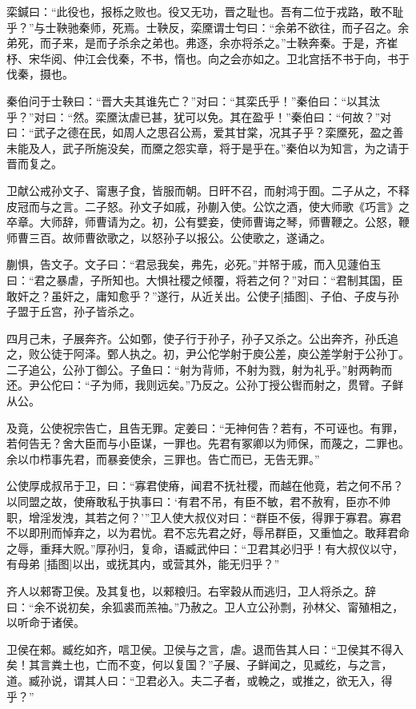\documentclass[a4paper,12pt,UTF8,twoside]{ctexbook}
\begin{document}
栾鍼曰：“此役也，报栎之败也。役又无功，晋之耻也。吾有二位于戎路，敢不耻乎？”与士鞅驰秦师，死焉。士鞅反，栾黡谓士匄曰：“余弟不欲往，而子召之。余弟死，而子来，是而子杀余之弟也。弗逐，余亦将杀之。”士鞅奔秦。于是，齐崔杼、宋华阅、仲江会伐秦，不书，惰也。向之会亦如之。卫北宫括不书于向，书于伐秦，摄也。

秦伯问于士鞅曰：“晋大夫其谁先亡？”对曰：“其栾氏乎！”秦伯曰：“以其汰乎？”对曰：“然。栾黡汰虐已甚，犹可以免。其在盈乎！”秦伯曰：“何故？”对曰：“武子之德在民，如周人之思召公焉，爱其甘棠，况其子乎？栾黡死，盈之善未能及人，武子所施没矣，而黡之怨实章，将于是乎在。”秦伯以为知言，为之请于晋而复之。

卫献公戒孙文子、甯惠子食，皆服而朝。日旰不召，而射鸿于囿。二子从之，不释皮冠而与之言。二子怒。孙文子如戚，孙蒯入使。公饮之酒，使大师歌《巧言》之卒章。大师辞，师曹请为之。初，公有嬖妾，使师曹诲之琴，师曹鞭之。公怒，鞭师曹三百。故师曹欲歌之，以怒孙子以报公。公使歌之，遂诵之。

蒯惧，告文子。文子曰：“君忌我矣，弗先，必死。”并帑于戚，而入见蘧伯玉曰：“君之暴虐，子所知也。大惧社稷之倾覆，将若之何？”对曰：“君制其国，臣敢奸之？虽奸之，庸知愈乎？”遂行，从近关出。公使子[插图]、子伯、子皮与孙子盟于丘宫，孙子皆杀之。

四月己未，子展奔齐。公如鄄，使子行于孙子，孙子又杀之。公出奔齐，孙氏追之，败公徒于阿泽。鄄人执之。初，尹公佗学射于庾公差，庾公差学射于公孙丁。二子追公，公孙丁御公。子鱼曰：“射为背师，不射为戮，射为礼乎。”射两軥而还。尹公佗曰：“子为师，我则远矣。”乃反之。公孙丁授公辔而射之，贯臂。子鲜从公。

及竟，公使祝宗告亡，且告无罪。定姜曰：“无神何告？若有，不可诬也。有罪，若何告无？舍大臣而与小臣谋，一罪也。先君有冢卿以为师保，而蔑之，二罪也。余以巾栉事先君，而暴妾使余，三罪也。告亡而已，无告无罪。”

公使厚成叔吊于卫，曰：“寡君使瘠，闻君不抚社稷，而越在他竟，若之何不吊？以同盟之故，使瘠敢私于执事曰：‘有君不吊，有臣不敏，君不赦宥，臣亦不帅职，增淫发洩，其若之何？’”卫人使大叔仪对曰：“群臣不佞，得罪于寡君。寡君不以即刑而悼弃之，以为君忧。君不忘先君之好，辱吊群臣，又重恤之。敢拜君命之辱，重拜大贶。”厚孙归，复命，语臧武仲曰：“卫君其必归乎！有大叔仪以守，有母弟 [插图]以出，或抚其内，或营其外，能无归乎？”

齐人以郲寄卫侯。及其复也，以郲粮归。右宰穀从而逃归，卫人将杀之。辞曰：“余不说初矣，余狐裘而羔袖。”乃赦之。卫人立公孙剽，孙林父、甯殖相之，以听命于诸侯。

卫侯在郲。臧纥如齐，唁卫侯。卫侯与之言，虐。退而告其人曰：“卫侯其不得入矣！其言粪土也，亡而不变，何以复国？”子展、子鲜闻之，见臧纥，与之言，道。臧孙说，谓其人曰：“卫君必入。夫二子者，或輓之，或推之，欲无入，得乎？”
\end{document}
